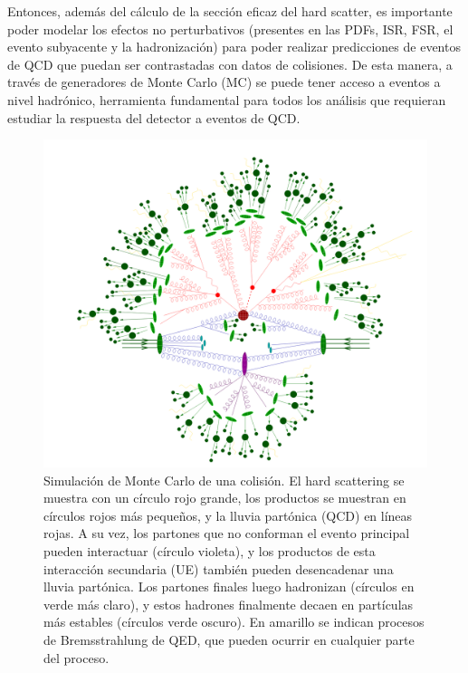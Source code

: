 Entonces, además del cálculo de la sección eficaz del hard scatter, es importante poder modelar los efectos no perturbativos (presentes en las PDFs, ISR, FSR, el evento subyacente y la hadronización) para poder realizar predicciones de eventos de QCD que puedan ser contrastadas con datos de colisiones. De esta manera, a través de generadores de Monte Carlo (MC) se puede tener acceso a eventos a nivel hadrónico, herramienta fundamental para todos los análisis que requieran estudiar la respuesta del detector a eventos de QCD.
\begin{figure}[h]
    \centering
    \includegraphics[width =0.8\linewidth]{images/MCgeneration}
    \caption{Simulación de Monte Carlo de una colisión. El hard scattering se muestra con un círculo rojo grande, los productos se muestran en círculos rojos más pequeños, y la lluvia partónica (QCD) en líneas rojas. A su vez, los partones que no conforman el evento principal pueden interactuar (círculo violeta), y los productos de esta interacción secundaria (UE) también pueden desencadenar una lluvia partónica. Los partones finales luego hadronizan (círculos en verde más claro), y estos hadrones finalmente  decaen en partículas más estables (círculos verde oscuro). En amarillo se indican procesos de Bremsstrahlung de QED, que pueden ocurrir en cualquier parte del proceso\cite{Sherpa}. }
    \label{fig:MCgeneration}
\end{figure}

